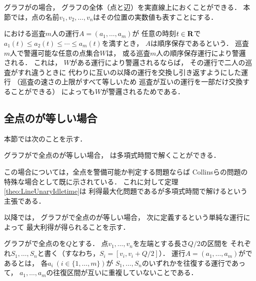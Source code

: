 \chapter{{\graphLine}}
\label{chapter: line}

グラフが{\graphLine}の場合，
グラフの全体（点と辺）を実直線上におくことができる．
本節では，点の名前$v_1, v_2, \ldots, v_n$はその位置の実数値も表すことにする．

{\graphLine}における巡査$m$人の運行$A = (a_1, \ldots, a_m)$が
任意の時刻$t \in \mathbf R$で
$a_1(t) \leq a_2(t) \leq \cdots \leq a_m(t)$を満すとき，
$A$は順序保存であるという．
巡査$m$人で警邏可能な任意の点集合$W$は，
或る巡査$m$人の順序保存運行により警邏される．
これは，
$W$がある運行により警邏されるならば，
その運行で二人の巡査がすれ違うときに
代わりに互いの以降の運行を交換し引き返すようにした運行
（巡査の速さの上限がすべて等しいため
巡査が互いの運行を一部だけ交換することができる）
によっても$W$が警邏されるためである．


\section{全点の{\maxIdletime}が等しい場合}
\label{subsec:LineUnaryIdletime}


本節では次のことを示す．

\begin{theo}
  \label{theo:LineUnaryIdletime}
  グラフが{\graphLine}で全点の{\maxIdletime}が等しい場合，
  {\patProb}は多項式時間で解くことができる．
\end{theo}

この場合については，全点を警備可能か判定する問題ならば
Collinsら\cite{collins2013optimal}の問題の特殊な場合として既に示されている．
これに対して定理\ref{theo:LineUnaryIdletime}は
利得最大化問題である{\patProb}が多項式時間で解けるという主張である．

以降では，
グラフが{\graphLine}で全点の{\maxIdletime}が等しい場合，
次に定義する{\indSectOperation}という単純な運行によって
最大利得が得られることを示す．

\begin{defi}
  \label{defi:independentSectionOperation}
  グラフが{\graphLine}で全点の{\maxIdletime}を$Q$とする．
  点$v_1, \ldots, v_n$を左端とする長さ$Q/2$の区間を
  それぞれ$S_1, \ldots, S_n$と書く（すなわち，$S_i = [v_i, v_i + Q/2]$）．
  運行$A = (a_1, \ldots, a_m)$が{\indSectOperation}であるとは，
  各$a_i\ (i \in \{ 1, \ldots, m \})$が
  $S_1, \ldots, S_n$のいずれかを往復する運行であって，
  $a_1, \ldots, a_m$の往復区間が互いに重複していないことである．
\end{defi}


